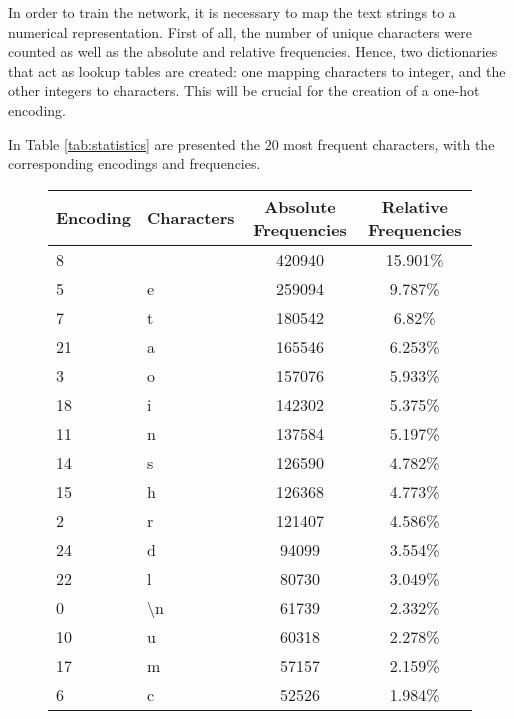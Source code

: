 \documentclass[a4paper,12pt]{article} %
\begin{document}
 	In order to train the network, it is necessary to map the text strings to a 
 	numerical representation. First of all,	the number of unique characters were counted as well as the absolute and relative frequencies. Hence, two dictionaries that act as lookup tables are created: one mapping characters to integer, and the other integers to characters. This will be crucial for the creation of a one-hot encoding.
 	
 	In Table \ref{tab:statistics} are presented the $20$ most frequent 
 	characters, with the corresponding encodings and frequencies.
	
	\begin{figure}[htb]
		\centering
		\begin{tabular}{llcc}
			\toprule
			Encoding & Characters &  Absolute Frequencies & Relative 
			Frequencies \\
			\midrule
			8        &           &              420940 &            15.901\% \\
			5        &         e &              259094 &             9.787\% \\
			7        &         t &              180542 &              6.82\% \\
			21       &         a &              165546 &             6.253\% \\
			3        &         o &              157076 &             5.933\% \\
			18       &         i &              142302 &             5.375\% \\
			11       &         n &              137584 &             5.197\% \\
			14       &         s &              126590 &             4.782\% \\
			15       &         h &              126368 &             4.773\% \\
			2        &         r &              121407 &             4.586\% \\
			24       &         d &               94099 &             3.554\% \\
			22       &         l &               80730 &             3.049\% \\
			0        &        \textbackslash n &               61739 
			& 2.332\% \\
			10       &         u &               60318 &             2.278\% \\
			17       &         m &               57157 &             2.159\% \\
			6        &         c &               52526 &             1.984\% \\

\end{tabular}
\end{figure}
\end{document}
